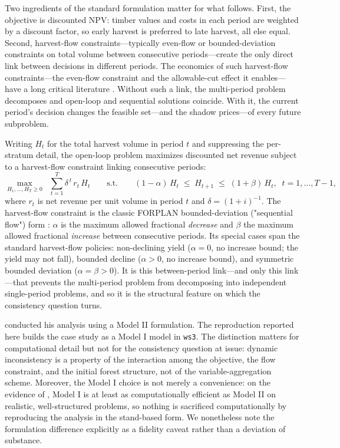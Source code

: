 \documentclass[12pt]{article}
\begin{document}
Two ingredients of the standard formulation matter for what follows. First, the objective is discounted NPV: timber values and costs in each period are weighted by a discount factor, so early harvest is preferred to late harvest, all else equal. Second, harvest-flow constraints---typically even-flow or bounded-deviation constraints on total volume between consecutive periods---create the only direct link between decisions in different periods. The economics of such harvest-flow constraints---the even-flow constraint and the allowable-cut effect it enables---have a long critical literature \citep{thompson1966traditional,schweitzer1972allowable,luckert1995allowable,hegan2000economic}. Without such a link, the multi-period problem decomposes and open-loop and sequential solutions coincide. With it, the current period's decision changes the feasible set---and the shadow prices---of every future subproblem.

Writing \(H_t\) for the total harvest volume in period \(t\) and suppressing the per-stratum detail, the open-loop problem maximizes discounted net revenue subject to a harvest-flow constraint linking consecutive periods:
\begin{equation}
\max_{H_1, \ldots, H_T \geq 0} \;\; \sum_{t=1}^{T} \delta^{\,t} \, r_t \, H_t
\qquad \text{s.t.} \qquad
(1 - \alpha)\, H_t \;\le\; H_{t+1} \;\le\; (1 + \beta)\, H_t, \;\; t = 1, \ldots, T-1,
\label{eq:openloop}
\end{equation}
where \(r_t\) is net revenue per unit volume in period \(t\) and \(\delta = (1+i)^{-1}\). The harvest-flow constraint is the classic FORPLAN bounded-deviation ("sequential flow") form \citep[eq.~3-4, 3-5]{daugherty1991credibility}: \(\alpha\) is the maximum allowed fractional \emph{decrease} and \(\beta\) the maximum allowed fractional \emph{increase} between consecutive periods. Its special cases span the standard harvest-flow policies: non-declining yield (\(\alpha = 0\), no increase bound; the yield may not fall), bounded decline (\(\alpha > 0\), no increase bound), and symmetric bounded deviation (\(\alpha = \beta > 0\)). It is this between-period link---and only this link---that prevents the multi-period problem from decomposing into independent single-period problems, and so it is the structural feature on which the consistency question turns.

\citet{daugherty1991credibility} conducted his analysis using a Model II formulation. The reproduction reported here builds the case study as a Model I model in \texttt{ws3}. The distinction matters for computational detail but not for the consistency question at issue: dynamic inconsistency is a property of the interaction among the objective, the flow constraint, and the initial forest structure, not of the variable-aggregation scheme. Moreover, the Model I choice is not merely a convenience: on the evidence of \citet{martin2017comparing}, Model I is at least as computationally efficient as Model II on realistic, well-structured problems, so nothing is sacrificed computationally by reproducing the analysis in the stand-based form. We nonetheless note the formulation difference explicitly as a fidelity caveat rather than a deviation of substance.
\end{document}
